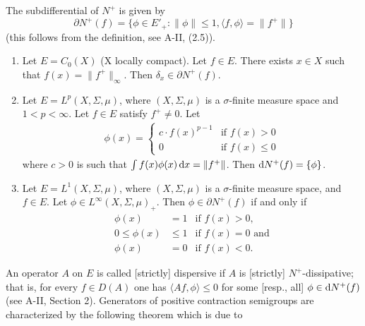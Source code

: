 The subdifferential of $N^{+}$ is given by
\begin{equation}\label{eq:c2-1.2}
	\partial N^{+}(f) = \{\phi \in E'_{+} \colon \|\phi\| \leq 1, \langle f,\phi \rangle = \|f^{+}\|\}
\end{equation}
(this follows from the definition, see A-II, (2.5)). 
\begin{examples}\label{ex:c2-1.1}
%
%
\begin{enumerate}[\upshape (i), wide, labelindent=.5em]  %
\item \label{ex:c2-1.1-1}
Let $E = C_{0}(X)$ (X locally compact). 
Let $f \in E$.
There exists $x \in X$ such that $f(x) = \|f^{+}\|_{\infty}$. 
Then $\delta_{x} \in \partial N^{+}(f)$.
\item \label{ex:c2-1.1-2}
Let $E = L^{p}(X,\Sigma,\mu)$, where $(X,\Sigma,\mu)$ is a $\sigma$-finite measure space and $1 < p < \infty$. Let $f \in E$ satisfy $f^{+} \neq 0$. Let
\begin{align*}
\phi(x) = 
    \begin{cases}
        c \cdot f(x)^{p-1} & \text{if } f(x) > 0 \\
        0 & \text{if } f(x) \leq 0
    \end{cases}
\end{align*}
where $c > 0$ is such that $\int f(x) \phi(x) \mathop{}\!\mathrm{d}{x} = \|f^{+}\|$.
Then $\mathop{}\!\mathrm{d}{N^{+}}(f) = \{\phi\}$.
\item \label{ex:c2-1.1-3}
Let $E = L^{1}(X,\Sigma,\mu)$, where $(X,\Sigma,\mu)$ is a $\sigma$-finite measure space, and $f \in E$. Let $\phi \in L^{\infty}(X,\Sigma,\mu)_{+}$. Then $\phi \in \partial N^{+}(f)$ if and only if
\begin{align*}
\phi(x) &= 1 & \text{if } f(x) > 0, \\
0 \leq \phi(x) &\leq 1 & \text{if } f(x) = 0 \text{ and} \\
\phi(x) &= 0 & \text{if } f(x) < 0.
\end{align*}
\end{enumerate}
\end{examples}
An operator $A$ on $E$ is called [strictly] dispersive if $A$ is [strictly] $N^{+}$-dissipative; that is, for every $f \in D(A)$ one has $\langle Af,\phi \rangle \leq 0$ for some [resp., all] $\phi \in \mathop{}\!\mathrm{d}{N^{+}}(f)$ (see A-II, Section 2). 
Generators of positive contraction semigroups are characterized by the following theorem which is due to 
